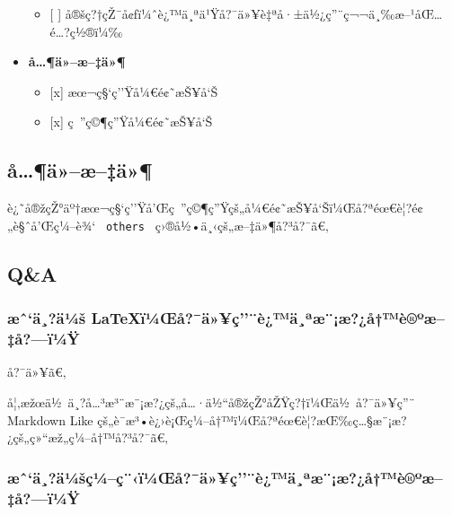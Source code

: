 \begin{itemize}
  \begin{itemize}
  \tightlist
  \item
    {[} {]}
    å®šç?†çŽ¯å¢ƒï¼ˆè¿™ä¸ªä¹Ÿå?¯ä»¥è‡ªå·±ä½¿ç''¨ç¬¬ä¸‰æ--¹åŒ\ldots é\ldots?ç½®ï¼‰
  \end{itemize}
\item
  \textbf{å\ldots¶ä»--æ--‡ä»¶}

  \begin{itemize}
  \tightlist
  \item
    {[}x{]} æœ¬ç§`ç''Ÿå¼€é¢˜æŠ¥å`Š
  \item
    {[}x{]} ç~''ç©¶ç''Ÿå¼€é¢˜æŠ¥å`Š
  \end{itemize}
\end{itemize}

\subsection{å\ldots¶ä»--æ--‡ä»¶}\label{uxe5uxe4uxe6uxe4}

è¿˜å®žçŽ°äº†æœ¬ç§`ç''Ÿå'Œç~''ç©¶ç''Ÿçš„å¼€é¢˜æŠ¥å`Šï¼Œå?ªéœ€è¦?é¢„è§ˆå'Œç¼--è¾`
\texttt{\ others\ } ç›®å½•ä¸‹çš„æ--‡ä»¶å?³å?¯ã€‚


\subsection{Q\&A}\label{qa}

\subsubsection{æˆ`ä¸?ä¼š
LaTeXï¼Œå?¯ä»¥ç''¨è¿™ä¸ªæ¨¡æ?¿å†™è®ºæ--‡å?---ï¼Ÿ}\label{uxe6ux2c6uxe4uxe4uxbcux161-latexuxefuxbcux153uxe5uxe4uxe7uxe8uxe4uxaauxe6uxe6uxe5uxe8uxbauxe6uxe5uxefuxbcuxff}

å?¯ä»¥ã€‚

å¦‚æžœä½~ä¸?å\ldots³æ³¨æ¨¡æ?¿çš„å\ldots·ä½``å®žçŽ°åŽŸç?†ï¼Œä½~å?¯ä»¥ç''¨
Markdown Like
çš„è¯­æ³•è¿›è¡Œç¼--å†™ï¼Œå?ªéœ€è¦?æŒ‰ç\ldots§æ¨¡æ?¿çš„ç»``æž„ç¼--å†™å?³å?¯ã€‚

\subsubsection{æˆ`ä¸?ä¼šç¼--ç¨‹ï¼Œå?¯ä»¥ç''¨è¿™ä¸ªæ¨¡æ?¿å†™è®ºæ--‡å?---ï¼Ÿ}\label{uxe6ux2c6uxe4uxe4uxbcux161uxe7uxbcuxe7uxefuxbcux153uxe5uxe4uxe7uxe8uxe4uxaauxe6uxe6uxe5uxe8uxbauxe6uxe5uxefuxbcuxff}

